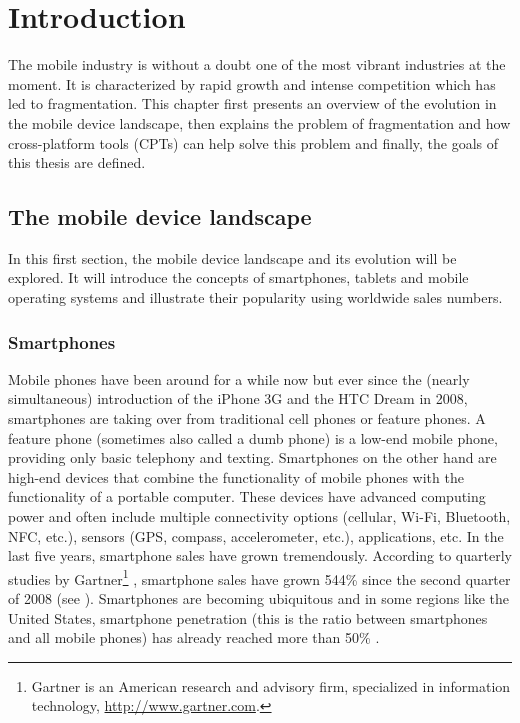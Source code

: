 \chapter{Introduction}
\label{cha:intro}

The mobile industry is without a doubt one of the most vibrant industries at the moment. It is characterized by rapid growth and intense competition which has led to fragmentation. This chapter first presents an overview of the evolution in the mobile device landscape, then explains the problem of fragmentation and how cross-platform tools (CPTs) can help solve this problem and finally, the goals of this thesis are defined.

\section{The mobile device landscape}

In this first section, the mobile device landscape and its evolution will be explored. It will introduce the concepts of smartphones, tablets and mobile operating systems and illustrate their popularity using worldwide sales numbers.

\subsection{Smartphones}

Mobile phones have been around for a while now but ever since the (nearly simultaneous) introduction of the iPhone 3G and the HTC Dream in 2008, smartphones are taking over from traditional cell phones or feature phones. A feature phone (sometimes also called a dumb phone) is a low-end mobile phone, providing only basic telephony and texting. Smartphones on the other hand are high-end devices that combine the functionality of mobile phones with the functionality of a portable computer. These devices have advanced computing power and often include multiple connectivity options (cellular, Wi-Fi, Bluetooth, NFC, etc.), sensors (GPS, compass, accelerometer, etc.), applications, etc. In the last five years, smartphone sales have grown tremendously. According to quarterly studies by Gartner\footnote{Gartner is an American research and advisory firm, specialized in information technology, \url{http://www.gartner.com}.} \citeGartner, smartphone sales have grown 544\% since the second quarter of 2008 (see ). Smartphones are becoming ubiquitous and in some regions like the United States, smartphone penetration (this is the ratio between smartphones and all mobile phones) has already reached more than 50\% \cite{Nielsen:2012}. 

